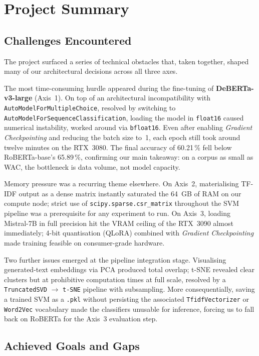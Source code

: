 \documentclass[11pt,a4paper]{article}
\begin{document}
\section{Project Summary}

\subsection{Challenges Encountered}

The project surfaced a series of technical obstacles that, taken together,
shaped many of our architectural decisions across all three axes.

The most time-consuming hurdle appeared during the fine-tuning of
\textbf{DeBERTa-v3-large} (Axis~1). On top of an architectural incompatibility
with \texttt{AutoModelForMultipleChoice}, resolved by switching to
\texttt{AutoModelForSequenceClassification}, loading the model in
\texttt{float16} caused numerical instability, worked around via
\texttt{bfloat16}. Even after enabling \textit{Gradient Checkpointing} and
reducing the batch size to~1, each epoch still took around twelve minutes on
the RTX~3080. The final accuracy of 60.21\,\% fell below RoBERTa-base's
65.89\,\%, confirming our main takeaway: on a corpus as small as WAC,
the bottleneck is data volume, not model capacity.

Memory pressure was a recurring theme elsewhere. On Axis~2, materialising
TF-IDF output as a dense matrix instantly saturated the 64~GB of RAM on our
compute node; strict use of \texttt{scipy.sparse.csr\_matrix} throughout the
SVM pipeline was a prerequisite for any experiment to run. On Axis~3, loading
Mistral-7B in full precision hit the VRAM ceiling of the RTX~3090 almost
immediately; 4-bit quantisation (QLoRA) combined with \textit{Gradient
Checkpointing} made training feasible on consumer-grade hardware.

Two further issues emerged at the pipeline integration stage. Visualising
generated-text embeddings via PCA produced total overlap; t-SNE revealed
clear clusters but at prohibitive computation times at full scale, resolved
by a \texttt{TruncatedSVD} $\rightarrow$ \texttt{t-SNE} pipeline with
subsampling. More consequentially, saving a trained SVM as a \texttt{.pkl}
without persisting the associated \texttt{TfidfVectorizer} or
\texttt{Word2Vec} vocabulary made the classifiers unusable for inference,
forcing us to fall back on RoBERTa for the Axis~3 evaluation step.

\subsection{Achieved Goals and Gaps}
\end{document}
